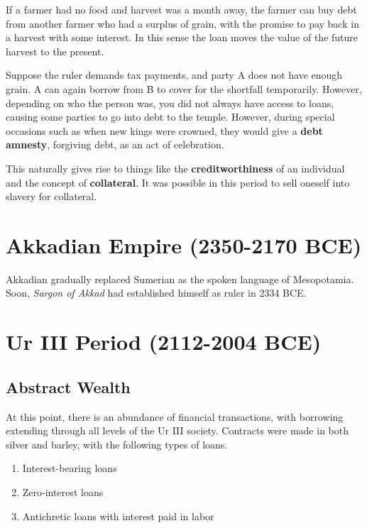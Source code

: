 \documentclass{article}
\begin{document}
    \begin{example}[Crops]
      If a farmer had no food and harvest was a month away, the farmer can buy debt from another farmer who had a surplus of grain, with the promise to pay back in a harvest with some interest. In this sense the loan moves the value of the future harvest to the present. 
    \end{example}

    \begin{example}
      Suppose the ruler demands tax payments, and party A does not have enough grain. A can again borrow from B to cover for the shortfall temporarily. However, depending on who the person was, you did not always have access to loans, causing some parties to go into debt to the temple. However, during special occasions such as when new kings were crowned, they would give a \textbf{debt amnesty}, forgiving debt, as an act of celebration. 
    \end{example}

    This naturally gives rise to things like the \textbf{creditworthiness} of an individual and the concept of \textbf{collateral}. It was possible in this period to sell oneself into slavery for collateral. 

\section{Akkadian Empire (2350-2170 BCE)}

  Akkadian gradually replaced Sumerian as the spoken language of Mesopotamia. Soon, \textit{Sargon of Akkad} had established himself as ruler in 2334 BCE. 

\section{Ur III Period (2112-2004 BCE)}

  \subsection{Abstract Wealth}

    At this point, there is an abundance of financial transactions, with borrowing extending through all levels of the Ur III society. Contracts were made in both silver and barley, with the following types of loans. 

    \begin{enumerate}
      \item Interest-bearing loans 
      \item Zero-interest loans 
      \item Antichretic loans with interest paid in labor
    \end{enumerate}
\end{document}
